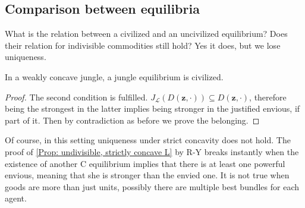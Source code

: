 \subsection{Comparison between equilibria}

What is the relation between a civilized and an uncivilized equilibrium? Does their relation for indivisible commodities still hold? Yes it does, but we lose uniqueness.

\begin{proposition}\label{Prop: jungle eq is C in weakly concave}
In a weakly concave jungle, a jungle equilibrium is civilized.

    \begin{proof}
        The second condition is fulfilled. $J_{\mathcal{L}}(D(\textbf{z},\cdot))\subseteq D(\textbf{z},\cdot)$, therefore being the strongest in the latter implies being stronger in the justified envious, if part of it. Then by contradiction as before we prove the belonging.
    \end{proof}
\end{proposition}

Of course, in this setting uniqueness under strict concavity does not hold. The proof of \cref{Prop: undivisible, strictly concave L} by R-Y\cite{RY} breaks instantly when the existence of another C equilibrium implies that there is at least one powerful envious, meaning that she is stronger than the envied one. It is not true when goods are more than just units, possibly there are multiple best bundles for each agent.
